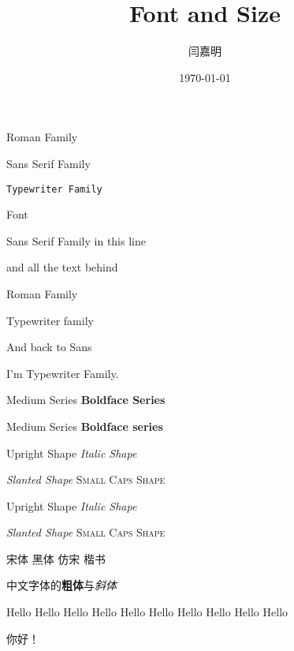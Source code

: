 \documentclass[UTF8]{ctexart}
\title{\heiti Font and Size}
\author{\kaishu 闫嘉明}
\date{\heiti \today}
\begin{document}
\maketitle
    \textrm{Roman Family}
    
    \textsf{Sans Serif Family}
    
    \texttt{Typewriter Family}
    
    Font

    \sffamily Sans Serif Family in this line

    and all the text behind
    
    {\rmfamily Roman Family}%
    
    {\ttfamily Typewriter family}

    And back to Sans
    
    \ttfamily%

    I'm Typewriter Family.
    \sffamily
    

    \textmd{Medium Series}  \textbf{Boldface Series}
    
    {\mdseries Medium Series}  {\bfseries Boldface series}

    \rmfamily
    \textup{Upright Shape}  \textit{Italic Shape} 

    \textsl{Slanted Shape}  \textsc{Small Caps Shape}%

    {\upshape Upright Shape}  {\itshape Italic Shape}  
    
    {\slshape Slanted Shape}  {\scshape Small Caps Shape}


    {\songti 宋体}  {\heiti 黑体}  {\fangsong 仿宋}  {\kaishu 楷书}

    中文字体的\textbf{粗体}与\textit{斜体}


    {\tiny Hello}
    {\scriptsize Hello}
    {\footnotesize Hello}
    {\small Hello}
    {\normalsize Hello}
    {\large Hello}
    {\Large Hello}
    {\LARGE Hello}
    {\huge Hello}
    {\Huge Hello}

 你好！
\end{document}
